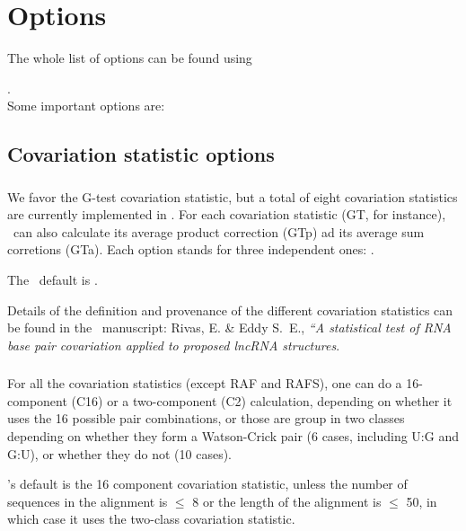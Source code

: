 
\section{Options}
\label{section:options}
\setcounter{footnote}{0}

The whole list of options can be found using 

.\\

Some important options are:
\subsection{Covariation statistic options}

\subsubsection{}

\subsubsection{}
We favor the G-test covariation statistic, but a total of eight
covariation statistics are currently implemented in \rscape. For each
covariation statistic (GT, for instance), \rscape\ can also calculate
its average product correction (GTp) ad its average sum corretions
(GTa).  Each option  stands for three independent ones:
.

The \rscape\ default is .

Details of the definition and provenance of the different covariation
statistics can be found in the \rscape\ manuscript: Rivas, E. \& Eddy
S.~E., \textit{``A statistical test of RNA base pair covariation
  applied to proposed lncRNA structures}.

\subsubsection{}
For all the covariation statistics (except RAF and RAFS), one can do a
16-component (C16) or a two-component (C2) calculation, depending on
whether it uses the 16 possible pair combinations, or those are group
in two classes depending on whether they form a Watson-Crick pair (6
cases, including U:G and G:U), or whether they do not (10 cases).

\rscape's default is the 16 component covariation statistic, unless
the number of sequences in the alignment is $\leq$ 8 or the length of
the alignment is $\leq$ 50, in which case it uses the two-class
covariation statistic.

